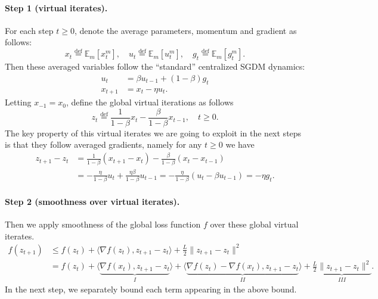 \paragraph{Step 1 (virtual iterates).} For each step $t \geq 0$, denote the average parameters, momentum and gradient as follows:
\[
x_t \stackrel{\text{def}}{=} \mathbb{E}_m[x_t^m], \quad
u_t \stackrel{\text{def}}{=} \mathbb{E}_m[u_t^m], \quad
g_t \stackrel{\text{def}}{=} \mathbb{E}_m[g_t^m].
\]
Then these averaged variables follow the ``standard'' centralized SGDM dynamics:
\begin{align*}
u_t &= \beta u_{t-1} + (1-\beta) g_t \\
x_{t+1} &= x_t - \eta u_t.
\end{align*}
Letting $x_{-1} = x_0$, define the global virtual iterations as follows
\[
z_t \stackrel{\text{def}}{=} \frac{1}{1-\beta} x_t - \frac{\beta}{1-\beta} x_{t-1}, \quad t \geq 0.
\]
The key property of this virtual iterates we are going to exploit in the next steps is that they follow averaged gradients, namely for any $t \geq 0$ we have
\begin{align*}
z_{t+1} - z_t &= \frac{1}{1-\beta}(x_{t+1} - x_t) - \frac{\beta}{1-\beta}(x_t - x_{t-1}) \\
&= -\frac{\eta}{1-\beta} u_t + \frac{\eta\beta}{1-\beta} u_{t-1}
 = -\frac{\eta}{1-\beta}(u_t - \beta u_{t-1}) = -\eta g_t.
\end{align*}

\paragraph{Step 2 (smoothness over virtual iterates).} Then we apply smoothness of the global loss function $f$ over these global virtual iterates.
\begin{align*}
f(z_{t+1}) &\leq f(z_t) + \langle \nabla f(z_t), z_{t+1} - z_t \rangle + \frac{L}{2}\|z_{t+1} - z_t\|^2 \\
&= f(z_t) + \langle \underbrace{\nabla f(x_t), z_{t+1} - z_t}_{I} \rangle
  + \langle \underbrace{\nabla f(z_t) - \nabla f(x_t), z_{t+1} - z_t}_{II} \rangle
  + \underbrace{\frac{L}{2}\|z_{t+1} - z_t\|^2}_{III}.
\end{align*}
In the next step, we separately bound each term appearing in the above bound.

